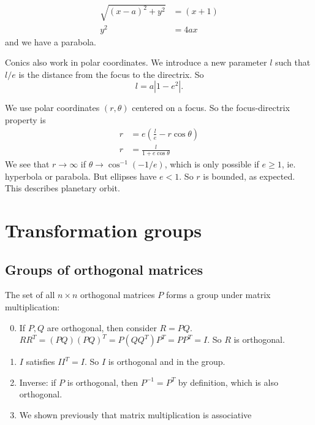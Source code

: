 \documentclass[a4paper]{article}
\begin{document}
\begin{enumerate}
\begin{center}
    \end{center}
    \begin{align*}
      \sqrt{(x - a)^2 + y^2} &= (x + 1)\\
      y^2 &= 4ax
    \end{align*}
    and we have a parabola.
\end{enumerate}

Conics also work in polar coordinates. We introduce a new parameter $l$ such that $l/e$ is the distance from the focus to the directrix. So
\[
  l = a|1 - e^2|.
\]

We use polar coordinates $(r, \theta)$ centered on a focus. So the focus-directrix property is
\begin{align*}
  r &= e\left(\frac{l}{e} - r\cos\theta\right)\\
  r &= \frac{l}{1 + e\cos\theta}
\end{align*}
We see that $r\to \infty$ if $\theta \to \cos^{-1}(-1/e)$, which is only possible if $e\geq 1$, ie. hyperbola or parabola. But ellipses have $e < 1$. So $r$ is bounded, as expected. This describes planetary orbit.

\section{Transformation groups}
\subsection{Groups of orthogonal matrices}
\begin{prop}
  The set of all $n\times n$ orthogonal matrices $P$ forms a group under matrix multiplication:
  \begin{enumerate}[label=\arabic{*}.]
      \setcounter{enumi}{-1}
    \item If $P, Q$ are orthogonal, then consider $R = PQ$. $RR^T = (PQ)(PQ)^T = P(QQ^T)P^T = PP^T = I$. So $R$ is orthogonal.
    \item $I$ satisfies $II^T = I$. So $I$ is orthogonal and in the group.
    \item Inverse: if $P$ is orthogonal, then $P^{-1}=P^T$ by definition, which is also orthogonal.
    \item We shown previously that matrix multiplication is associative
  \end{enumerate}
\end{prop}
\end{document}
